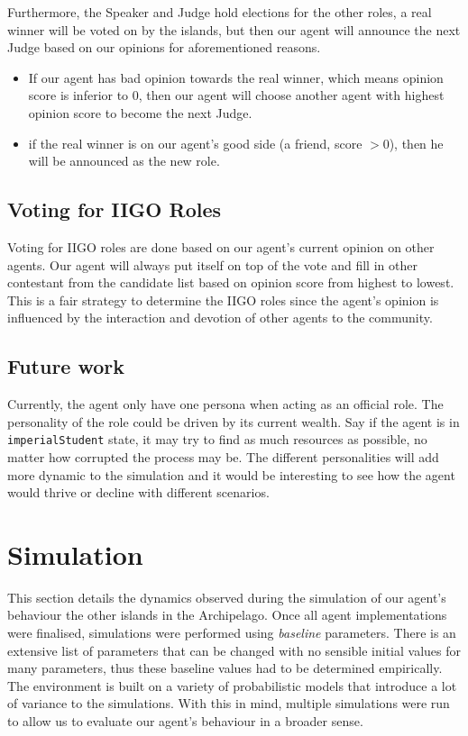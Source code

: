 Furthermore, the Speaker and Judge hold elections for the other roles, a real winner will be voted on by the islands, but then our agent will announce the next Judge based on our opinions for aforementioned reasons.
    \begin{itemize}
        \item If our agent has bad opinion towards the real winner, which means opinion score is inferior to $0$, then our agent will choose another agent with highest opinion score to become the next Judge.
        \item if the real winner is on our agent's good side (a friend, score $> 0$), then he will be announced as the new role.
    \end{itemize}

\subsection{Voting for IIGO Roles}
Voting for IIGO roles are done based on our agent's current opinion on other agents. Our agent will always put itself on top of the vote and fill in other contestant from the candidate list based on opinion score from highest to lowest. This is a fair strategy to determine the IIGO roles since the agent's opinion is influenced by the interaction and devotion of other agents to the community. 

\subsection{Future work}
Currently, the agent only have one persona when acting as an official role. The personality of the role could be driven by its current wealth. Say if the agent is in \texttt{imperialStudent} state, it may try to find as much resources as possible, no matter how corrupted the process may be. The different personalities will add more dynamic to the simulation and it would be interesting to see how the agent would thrive or decline with different scenarios. 
\section{Simulation}

This section details the dynamics observed during the simulation of our agent's behaviour the other islands in the Archipelago. Once all agent implementations were finalised, simulations were performed using \textit{baseline} parameters. There is an extensive list of parameters that can be changed with no sensible initial values for many parameters, thus these baseline values had to be determined empirically. The environment is built on a variety of probabilistic models that introduce a lot of variance to the simulations. With this in mind, multiple simulations were run to allow us to evaluate our agent's behaviour in a broader sense.

